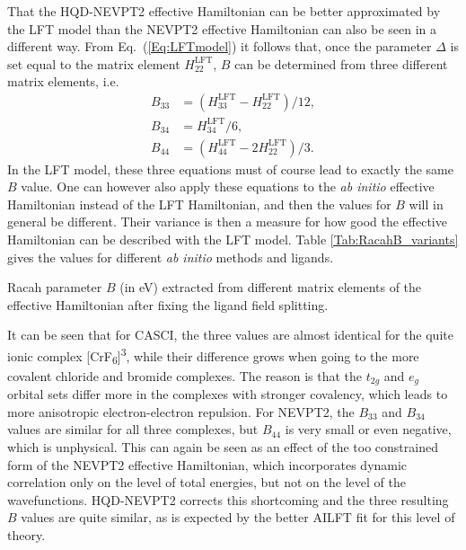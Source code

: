 That the HQD-NEVPT2 effective Hamiltonian can be better approximated by the LFT model than the NEVPT2 effective Hamiltonian can also be seen in a different way. From Eq.~(\ref{Eq:LFTmodel}) it follows that, once the parameter $\Delta $ is set equal to the matrix element $H_{22}^{{\text{LFT}}}$, $B$ can be determined from three different matrix elements, i.e.
	\begin{align}
	{B_{33}} &= (H_{33}^{{\text{LFT}}} - H_{22}^{{\text{LFT}}})/12, \\
	{B_{34}} &= H_{34}^{{\text{LFT}}}/6, \\
	{B_{44}} &= (H_{44}^{{\text{LFT}}} - 2H_{22}^{{\text{LFT}}})/3.
	\end{align}
In the LFT model, these three equations must of course lead to exactly the same $B$ value. One can however also apply these equations to the \textit{ab initio} effective Hamiltonian instead of the LFT Hamiltonian, and then the values for $B$ will in general be different. Their variance is then a measure for how good the effective Hamiltonian can be described with the LFT model. Table \ref{Tab:RacahB_variants} gives the values for different \textit{ab initio} methods and ligands.
\begin{table}
\small
\centering
\ttabbox
{\caption[Racah parameter $B$ extracted from different matrix elements of the effective Hamiltonian after fixing the ligand field splitting.]{Racah parameter $B$ (in eV) extracted from different matrix elements of the effective Hamiltonian after fixing the ligand field splitting.}
\label{Tab:RacahB_variants}}
{}
\end{table}
It can be seen that for CASCI, the three values are almost identical for the quite ionic complex [CrF\textsubscript{6}]\textsuperscript{3\textminus}, while their difference grows when going to the more covalent chloride and bromide complexes. The reason is that the $t_{2g}$ and $e_g$ orbital sets differ more in the complexes with stronger covalency, which leads to more anisotropic electron-electron repulsion. For NEVPT2, the $B_{33}$ and $B_{34}$ values are similar for all three complexes, but $B_{44}$ is very small or even negative, which is unphysical. This can again be seen as an effect of the too constrained form of the NEVPT2 effective Hamiltonian, which incorporates dynamic correlation only on the level of total energies, but not on the level of the wavefunctions. HQD-NEVPT2 corrects this shortcoming and the three resulting $B$ values are quite similar, as is expected by the better AILFT fit for this level of theory.

